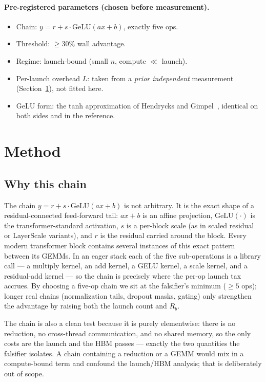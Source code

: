 \documentclass[11pt,a4paper]{article}
\begin{document}
\paragraph{Pre-registered parameters (chosen before measurement).}
\begin{itemize}\itemsep0.2em
\item Chain: $y = r + s\cdot\mathrm{GeLU}(a x + b)$, exactly five ops.
\item Threshold: $\ge 30\%$ wall advantage.
\item Regime: launch-bound (small $n$, compute $\ll$ launch).
\item Per-launch overhead $L$: taken from a \emph{prior independent}
  measurement (Section~\ref{sec:method}), not fitted here.
\item GeLU form: the tanh approximation of Hendrycks and
  Gimpel~\cite{hendrycks2016gelu}, identical on both sides and in the
  reference.
\end{itemize}

\section{Method}
\label{sec:method}

\subsection{Why this chain}

The chain $y = r + s\cdot\mathrm{GeLU}(a x + b)$ is not arbitrary. It is the
exact shape of a residual-connected feed-forward tail: $a x + b$ is an affine
projection, $\mathrm{GeLU}(\cdot)$ is the transformer-standard activation, $s$ is
a per-block scale (as in scaled residual or LayerScale variants), and $r$ is
the residual carried around the block. Every modern transformer block contains
several instances of this exact pattern between its GEMMs. In an eager stack
each of the five sub-operations is a library call --- a multiply kernel, an add
kernel, a GELU kernel, a scale kernel, and a residual-add kernel --- so the chain
is precisely where the per-op launch tax accrues. By choosing a five-op chain
we sit at the falsifier's minimum ($\ge 5$ ops); longer real chains
(normalization tails, dropout masks, gating) only strengthen the advantage by
raising both the launch count and $R_b$.

The chain is also a clean test because it is purely elementwise: there is no
reduction, no cross-thread communication, and no shared memory, so the only
costs are the launch and the HBM passes --- exactly the two quantities the
falsifier isolates. A chain containing a reduction or a GEMM would mix in a
compute-bound term and confound the launch/HBM analysis; that is deliberately
out of scope.
\end{document}

